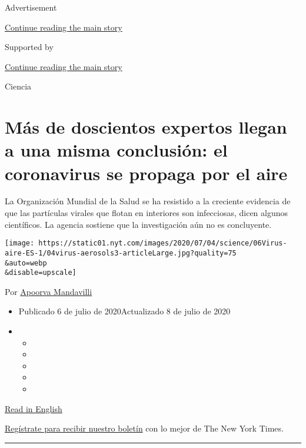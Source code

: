 Advertisement

\protect\hyperlink{after-top}{Continue reading the main story}

Supported by

\protect\hyperlink{after-sponsor}{Continue reading the main story}

Ciencia

\hypertarget{muxe1s-de-doscientos-expertos-llegan-a-una-misma-conclusiuxf3n-el-coronavirus-se-propaga-por-el-aire}{%
\section{Más de doscientos expertos llegan a una misma conclusión: el
coronavirus se propaga por el
aire}\label{muxe1s-de-doscientos-expertos-llegan-a-una-misma-conclusiuxf3n-el-coronavirus-se-propaga-por-el-aire}}

La Organización Mundial de la Salud se ha resistido a la creciente
evidencia de que las partículas virales que flotan en interiores son
infecciosas, dicen algunos científicos. La agencia sostiene que la
investigación aún no es concluyente.

\texttt{[image: https://static01.nyt.com/images/2020/07/04/science/06Virus-aire-ES-1/04virus-aerosols3-articleLarge.jpg?quality=75\\\&auto=webp\\\&disable=upscale]}

Por \href{https://www.nytimes.com/by/apoorva-mandavilli}{Apoorva
Mandavilli}

\begin{itemize}
\item
  Publicado 6 de julio de 2020Actualizado 8 de julio de 2020
\item
  \begin{itemize}
  \item
  \item
  \item
  \item
  \item
  \end{itemize}
\end{itemize}

\href{https://www.nytimes.com/2020/07/04/health/239-experts-with-one-big-claim-the-coronavirus-is-airborne.html}{Read
in English}

\href{https://www.nytimes.com/newsletters/el-times}{Regístrate para
recibir nuestro boletín} con lo mejor de The New York Times.

\begin{center}\rule{0.5\linewidth}{\linethickness}\end{center}

